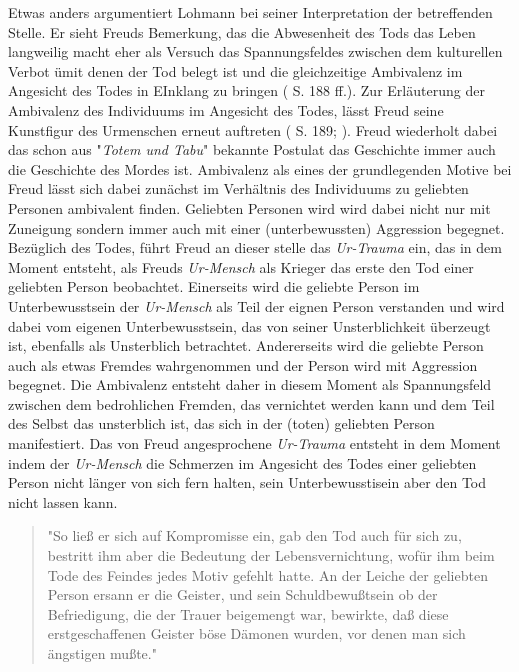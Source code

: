 \documentclass[11pt,a4paper,oneside,numbers=noenddot,bibliography=totocnumbered,DIV=13]{scrartcl}
\begin{document}
{Etwas anders argumentiert Lohmann bei seiner Interpretation der betreffenden Stelle. Er sieht Freuds Bemerkung, das die Abwesenheit des Tods das Leben langweilig macht eher als Versuch das Spannungsfeldes zwischen dem kulturellen Verbot ümit denen der Tod belegt ist und die gleichzeitige Ambivalenz im Angesicht des Todes in EInklang zu bringen (\cite{lohmann_freud-handbuch:_2013} S. 188 ff.).
Zur Erläuterung der Ambivalenz des Individuums im Angesicht des Todes, lässt Freud seine Kunstfigur des Urmenschen erneut auftreten (\cite{lohmann_freud-handbuch:_2013} S. 189; 
). Freud wiederholt dabei das schon aus "\textit{Totem und Tabu}" bekannte Postulat das Geschichte immer auch die Geschichte des Mordes ist. Ambivalenz als eines der grundlegenden Motive bei Freud lässt sich dabei zunächst im Verhältnis des Individuums zu geliebten Personen ambivalent finden. Geliebten Personen wird wird dabei nicht nur mit Zuneigung sondern immer auch mit einer (unterbewussten) Aggression begegnet. Bezüglich des Todes, führt Freud an dieser stelle das \textit{Ur-Trauma} ein, das in dem Moment entsteht, als Freuds \textit{Ur-Mensch} als Krieger das erste den Tod einer geliebten Person beobachtet. Einerseits wird die geliebte Person im Unterbewusstsein der \textit{Ur-Mensch} als Teil der eignen Person verstanden und wird dabei vom eigenen Unterbewusstsein, das von seiner Unsterblichkeit überzeugt ist, ebenfalls als Unsterblich betrachtet. Andererseits wird die geliebte Person auch als etwas Fremdes wahrgenommen und der Person wird mit Aggression begegnet. Die Ambivalenz entsteht daher in diesem Moment als Spannungsfeld zwischen dem bedrohlichen Fremden, das vernichtet werden kann und dem Teil des Selbst das unsterblich ist, das sich in der (toten) geliebten Person manifestiert.
Das von Freud angesprochene \textit{Ur-Trauma} entsteht in dem Moment indem der \textit{Ur-Mensch} die Schmerzen im Angesicht des Todes einer geliebten Person nicht länger von sich fern halten, sein Unterbewusstisein aber den Tod nicht lassen kann. 
\begin{quote}
"So ließ er sich auf Kompromisse ein, gab den Tod auch für sich zu, bestritt ihm aber die Bedeutung der Lebensvernichtung, wofür ihm beim Tode des Feindes jedes Motiv gefehlt hatte. An der Leiche der geliebten Person ersann er die Geister, und sein Schuldbewußtsein ob der Befriedigung, die der Trauer beigemengt war, bewirkte, daß diese erstgeschaffenen Geister böse Dämonen wurden, vor denen man sich ängstigen mußte." 
\end{quote}
}
\end{document}
